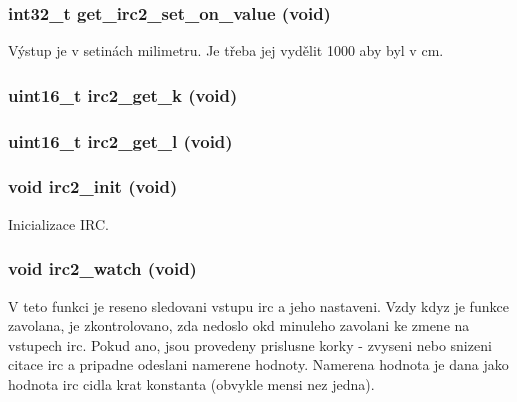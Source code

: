 \subsubsection[{get\_\-irc2\_\-set\_\-on\_\-value}]{\setlength{\rightskip}{0pt plus 5cm}int32\_\-t get\_\-irc2\_\-set\_\-on\_\-value (void)}\label{irc2_8h_a5c251d5e2c3b9f72e291eada25902d54}


Výstup je v setinách milimetru. Je třeba jej vydělit 1000 aby byl v cm. 
\subsubsection[{irc2\_\-get\_\-k}]{\setlength{\rightskip}{0pt plus 5cm}uint16\_\-t irc2\_\-get\_\-k (void)}\label{irc2_8h_a8a8e13b00bbf1550a74a1aa2fd637470}
\subsubsection[{irc2\_\-get\_\-l}]{\setlength{\rightskip}{0pt plus 5cm}uint16\_\-t irc2\_\-get\_\-l (void)}\label{irc2_8h_a9a7f216fac24f1bb5342700bdfcc865a}
\subsubsection[{irc2\_\-init}]{\setlength{\rightskip}{0pt plus 5cm}void irc2\_\-init (void)}\label{irc2_8h_a82d08977a4cf71b6cad65346a58ec837}
Inicializace IRC. 
\subsubsection[{irc2\_\-watch}]{\setlength{\rightskip}{0pt plus 5cm}void irc2\_\-watch (void)}\label{irc2_8h_ac24ca6f0906ccdfb6ffe65d2a28abaf7}
V teto funkci je reseno sledovani vstupu irc a jeho nastaveni. Vzdy kdyz je funkce zavolana, je zkontrolovano, zda nedoslo okd minuleho zavolani ke zmene na vstupech irc. Pokud ano, jsou provedeny prislusne korky -\/ zvyseni nebo snizeni citace irc a pripadne odeslani namerene hodnoty. Namerena hodnota je dana jako hodnota irc cidla krat konstanta (obvykle mensi nez jedna). 
